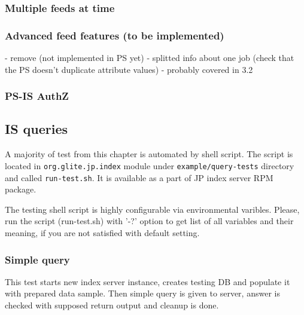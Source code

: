 \subsubsection{Multiple feeds at time}

\subsubsection{Advanced feed features (to be implemented)}
- remove (not implemented in PS yet)
- splitted info about one job (check that the PS doesn't duplicate
  attribute values) - probably covered in 3.2


\subsubsection{PS-IS AuthZ}

\subsection{IS queries}


%
%
%

A majority of test from this chapter is automated by shell
script. The script is located in \texttt{org.glite.jp.index} module
under \texttt{example/query-tests} directory and called \texttt{run-test.sh}.
It is available as a part of JP index server RPM package.

\begin{hints}
The testing shell script is highly configurable via
environmental varibles.  Please, run the script (run-test.sh) with
'-?' option to get list of all variables and their meaning, if you are
not satisfied with default setting.
\end{hints}

\subsubsection{Simple query}
This test starts new index server instance, creates testing DB
and populate it with prepared data sample. Then simple query is given
to server, answer is checked with supposed return output and
cleanup is done.



